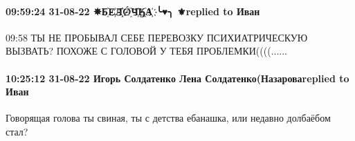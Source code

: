  
 
 
 
 

\paragraph{09:59:24 31-08-22 ✵Б҈E҉Л҉҈Ǿ҈Ч҉Ӄ҈А҉ ╰♥╮ ⚜replied to Иван}
09:58
ТЫ НЕ ПРОБЫВАЛ СЕБЕ ПЕРЕВОЗКУ ПСИХИАТРИЧЕСКУЮ ВЫЗВАТЬ? ПОХОЖЕ С ГОЛОВОЙ У ТЕБЯ ПРОБЛЕМКИ((((......

\paragraph{10:25:12 31-08-22 Игорь Солдатенко Лена Солдатенко(Назароваreplied to Иван}
Говорящая голова ты свиная, ты с детства ебанашка, или недавно долбаёбом стал?
